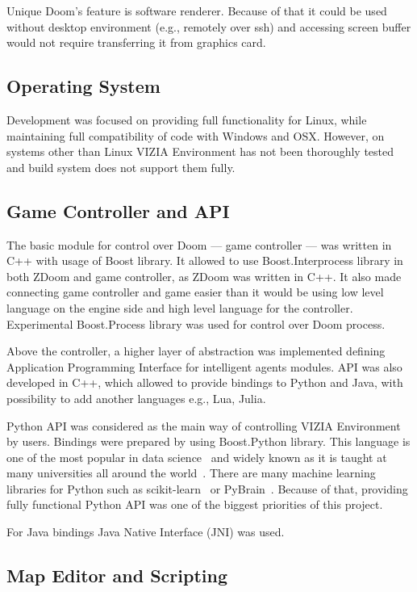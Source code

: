 \documentclass[english,bachelor,a4paper,twoside]{ppfcmthesis}
\begin{document}
Unique Doom's feature is software renderer. Because of that it could be used without desktop environment (e.g., remotely over ssh) and accessing screen buffer would not require transferring it from graphics card.


\subsection{Operating System}

Development was focused on providing full functionality for Linux, while maintaining full compatibility of code with Windows and OSX. 
However, on systems other than Linux VIZIA Environment has not been thoroughly tested and build system does not support them fully.

\subsection{Game Controller and API}


The basic module for control over Doom --- game controller --- was written in C++ with usage of Boost library.
It allowed to use Boost.Interprocess library in both ZDoom and game controller, as ZDoom was written in C++.
It also made connecting game controller and game easier than it would be using low level language on the engine side and high level language for the controller.
Experimental Boost.Process library was used for control over Doom process.


Above the controller, a higher layer of abstraction was implemented defining Application Programming Interface for intelligent agents modules.
API was also developed in C++, which allowed to provide bindings to Python and Java, with possibility to add another languages e.g., Lua, Julia.


Python API was considered as the main way of controlling VIZIA Environment by users.
Bindings were prepared by using Boost.Python library.
This language is one of the most popular in data science~\cite{ds_lang} and widely known as it is taught at many universities all around the world~\cite{pythons_schools}.
There are many machine learning libraries for Python such as scikit-learn~\cite{scikit} or PyBrain~\cite{pybrain}.
Because of that, providing fully functional Python API was one of the biggest priorities of this project.


For Java bindings Java Native Interface (JNI) was used.


\subsection{Map Editor and Scripting}
\end{document}
